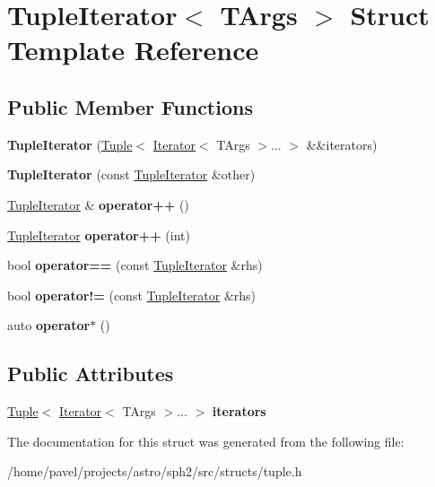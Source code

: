\hypertarget{structTupleIterator}{}\section{Tuple\+Iterator$<$ T\+Args $>$ Struct Template Reference}
\label{structTupleIterator}
\subsection*{Public Member Functions}
\begin{DoxyCompactItemize}
\item 
\hypertarget{structTupleIterator_a08d9dc5e7c57cfd999e48deb91f57d65}{}\label{structTupleIterator_a08d9dc5e7c57cfd999e48deb91f57d65} 
{\bfseries Tuple\+Iterator} (\hyperlink{classTuple}{Tuple}$<$ \hyperlink{classIterator}{Iterator}$<$ T\+Args $>$... $>$ \&\&iterators)
\item 
\hypertarget{structTupleIterator_a935576c6a701d0e4e88ad36b1a8a7157}{}\label{structTupleIterator_a935576c6a701d0e4e88ad36b1a8a7157} 
{\bfseries Tuple\+Iterator} (const \hyperlink{structTupleIterator}{Tuple\+Iterator} \&other)
\item 
\hypertarget{structTupleIterator_a90a0c09dfe5a031d573244077597b7af}{}\label{structTupleIterator_a90a0c09dfe5a031d573244077597b7af} 
\hyperlink{structTupleIterator}{Tuple\+Iterator} \& {\bfseries operator++} ()
\item 
\hypertarget{structTupleIterator_a3a27e1029be2624938fe20083c61e808}{}\label{structTupleIterator_a3a27e1029be2624938fe20083c61e808} 
\hyperlink{structTupleIterator}{Tuple\+Iterator} {\bfseries operator++} (int)
\item 
\hypertarget{structTupleIterator_a3991baef313f0db1d6aa893aa062a71b}{}\label{structTupleIterator_a3991baef313f0db1d6aa893aa062a71b} 
bool {\bfseries operator==} (const \hyperlink{structTupleIterator}{Tuple\+Iterator} \&rhs)
\item 
\hypertarget{structTupleIterator_ac561910a7e89c492c75cabfac29dbf60}{}\label{structTupleIterator_ac561910a7e89c492c75cabfac29dbf60} 
bool {\bfseries operator!=} (const \hyperlink{structTupleIterator}{Tuple\+Iterator} \&rhs)
\item 
\hypertarget{structTupleIterator_a078c2956bf6f4dce4b954ce1725f80e5}{}\label{structTupleIterator_a078c2956bf6f4dce4b954ce1725f80e5} 
auto {\bfseries operator$\ast$} ()
\end{DoxyCompactItemize}
\subsection*{Public Attributes}
\begin{DoxyCompactItemize}
\item 
\hypertarget{structTupleIterator_ad80624de800c0ab7cc125ae9528533fe}{}\label{structTupleIterator_ad80624de800c0ab7cc125ae9528533fe} 
\hyperlink{classTuple}{Tuple}$<$ \hyperlink{classIterator}{Iterator}$<$ T\+Args $>$... $>$ {\bfseries iterators}
\end{DoxyCompactItemize}


The documentation for this struct was generated from the following file\+:\begin{DoxyCompactItemize}
\item 
/home/pavel/projects/astro/sph2/src/structs/tuple.\+h\end{DoxyCompactItemize}
